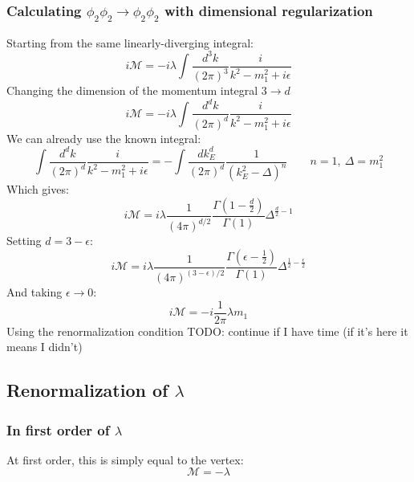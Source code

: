 \documentclass{article}
\begin{document}
\subsubsection{Calculating $\phi_2\phi_2 \rightarrow \phi_2\phi_2$ with dimensional regularization}
Starting from the same linearly-diverging integral:
\begin{equation}
    i\mathcal{M} = -i\lambda \int \frac{d^3k}{(2\pi)^3} \frac{i}{k^2 - m_1^2 + i\epsilon}
\end{equation}
Changing the dimension of the momentum integral $3 \rightarrow d$
\begin{equation}
    i\mathcal{M} = -i\lambda \int \frac{d^dk}{(2\pi)^d} \frac{i}{k^2 - m_1^2 + i\epsilon}
\end{equation}
We can already use the known integral:
\begin{equation}
    \int \frac{d^dk}{(2\pi)^d} \frac{i}{k^2 - m_1^2 + i\epsilon} = -\int \frac{dk_E^d}{(2\pi)^d} \frac{1}{(k_E^2 - \Delta)^n}
    \qquad n = 1, \ \Delta = m_1^2
\end{equation}
Which gives:
\begin{equation}
    i\mathcal{M} = i\lambda \frac{1}{(4\pi)^{d/2}}\frac{\Gamma\left(1 - \frac{d}{2}\right)}{\Gamma(1)} \Delta^{\frac{d}{2} - 1}
\end{equation}
Setting $d = 3 - \epsilon$:
\begin{equation}
    i\mathcal{M} = i\lambda \frac{1}{(4\pi)^{(3 - \epsilon)/2}}\frac{\Gamma\left(\epsilon-\frac{1}{2}\right)}{\Gamma(1)} \Delta^{\frac{1}{2} - \frac{\epsilon}{2}}
\end{equation}
And taking $\epsilon \rightarrow 0$:
\begin{equation}
    i\mathcal{M} = -i\frac{1}{2\pi}\lambda m_1
\end{equation}
Using the renormalization condition
TODO: continue if I have time (if it's here it means I didn't)
\subsection{Renormalization of $\lambda$}
\subsubsection{In first order of $\lambda$}
At first order, this is simply equal to the vertex:
\begin{equation}
    \mathcal{M} = -\lambda
\end{equation}
\end{document}

